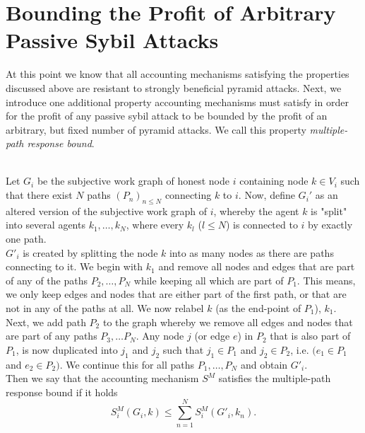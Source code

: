 \section{Bounding the Profit of Arbitrary Passive Sybil Attacks}
\label{sec:Bounding the Profit of Arbitrary Passive Sybil Attacks}
\noindent{}At this point we know that all accounting mechanisms satisfying the properties discussed above are resistant to strongly beneficial pyramid attacks. Next, we introduce one additional property accounting mechanisms must satisfy in order for the profit of any passive sybil attack to be bounded by the profit of an arbitrary, but fixed number of pyramid attacks. We call this property {\it multiple-path response bound}.\vspace{1em}\\

\begin{definition}\ \\
\label{def:Multiple-path Response Bound}
Let $G_i$ be the subjective work graph of honest node $i$ containing node $k\in{}V_i$ such that there exist $N$ paths $(P_n)_{n\leq{}N}$ connecting $k$ to $i$. Now, define $G_i'$ as an altered version of the subjective work graph of $i$, whereby the agent $k$ is "split" into several agents $k_{1},\ldots,k_{N}$, where every $k_l$ ($l\leq{}N$) is connected to $i$ by exactly one path. \vspace{1em}\\

\noindent{}$G'_i$ is created by splitting the node $k$ into as many nodes as there are paths connecting to it. We begin with $k_1$ and remove all nodes and edges that are part of any of the paths $P_2,\ldots,P_N$ while keeping all which are part of $P_1$. This means, we only keep edges and nodes that are either part of the first path, or that are not in any of the paths at all. We now relabel $k$ (as the end-point of $P_1$), $k_1$. Next, we add path $P_2$ to the graph whereby we remove all edges and nodes that are part of any paths $P_3,\ldots{}P_N$. Any node $j$ (or edge $e$) in $P_2$ that is also part of $P_1$, is now duplicated into $j_1$ and $j_2$ such that $j_1\in{}P_1$ and $j_2\in{}P_2$, i.e. $(e_1\in{}P_1$ and $e_2\in{}P_2)$. We continue this for all paths $P_1,\ldots,P_N$ and obtain $G'_i$. \vspace{1em}\\

\noindent{}Then we say that the accounting mechanism $S^M$ satisfies the multiple-path response bound if it holds
\[
S^M_i(G_i,k)\leq{}\sum\limits_{n=1}^{N}S^M_i(G'_i,k_n).
\]


\end{definition}
